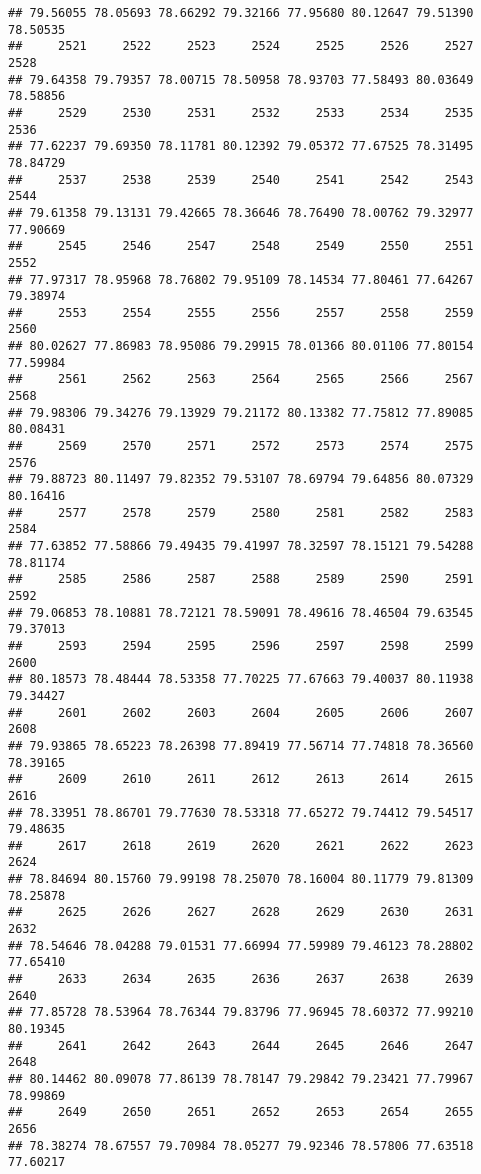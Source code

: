\documentclass[
]{article}
\begin{document}
\begin{verbatim}
## 79.56055 78.05693 78.66292 79.32166 77.95680 80.12647 79.51390 78.50535 
##     2521     2522     2523     2524     2525     2526     2527     2528 
## 79.64358 79.79357 78.00715 78.50958 78.93703 77.58493 80.03649 78.58856 
##     2529     2530     2531     2532     2533     2534     2535     2536 
## 77.62237 79.69350 78.11781 80.12392 79.05372 77.67525 78.31495 78.84729 
##     2537     2538     2539     2540     2541     2542     2543     2544 
## 79.61358 79.13131 79.42665 78.36646 78.76490 78.00762 79.32977 77.90669 
##     2545     2546     2547     2548     2549     2550     2551     2552 
## 77.97317 78.95968 78.76802 79.95109 78.14534 77.80461 77.64267 79.38974 
##     2553     2554     2555     2556     2557     2558     2559     2560 
## 80.02627 77.86983 78.95086 79.29915 78.01366 80.01106 77.80154 77.59984 
##     2561     2562     2563     2564     2565     2566     2567     2568 
## 79.98306 79.34276 79.13929 79.21172 80.13382 77.75812 77.89085 80.08431 
##     2569     2570     2571     2572     2573     2574     2575     2576 
## 79.88723 80.11497 79.82352 79.53107 78.69794 79.64856 80.07329 80.16416 
##     2577     2578     2579     2580     2581     2582     2583     2584 
## 77.63852 77.58866 79.49435 79.41997 78.32597 78.15121 79.54288 78.81174 
##     2585     2586     2587     2588     2589     2590     2591     2592 
## 79.06853 78.10881 78.72121 78.59091 78.49616 78.46504 79.63545 79.37013 
##     2593     2594     2595     2596     2597     2598     2599     2600 
## 80.18573 78.48444 78.53358 77.70225 77.67663 79.40037 80.11938 79.34427 
##     2601     2602     2603     2604     2605     2606     2607     2608 
## 79.93865 78.65223 78.26398 77.89419 77.56714 77.74818 78.36560 78.39165 
##     2609     2610     2611     2612     2613     2614     2615     2616 
## 78.33951 78.86701 79.77630 78.53318 77.65272 79.74412 79.54517 79.48635 
##     2617     2618     2619     2620     2621     2622     2623     2624 
## 78.84694 80.15760 79.99198 78.25070 78.16004 80.11779 79.81309 78.25878 
##     2625     2626     2627     2628     2629     2630     2631     2632 
## 78.54646 78.04288 79.01531 77.66994 77.59989 79.46123 78.28802 77.65410 
##     2633     2634     2635     2636     2637     2638     2639     2640 
## 77.85728 78.53964 78.76344 79.83796 77.96945 78.60372 77.99210 80.19345 
##     2641     2642     2643     2644     2645     2646     2647     2648 
## 80.14462 80.09078 77.86139 78.78147 79.29842 79.23421 77.79967 78.99869 
##     2649     2650     2651     2652     2653     2654     2655     2656 
## 78.38274 78.67557 79.70984 78.05277 79.92346 78.57806 77.63518 77.60217 

\end{verbatim}
\end{document}

